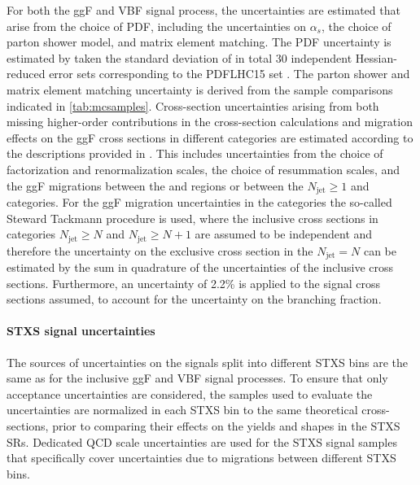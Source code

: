 For both the ggF and VBF signal process, the uncertainties are estimated that arise from the choice of PDF, including the uncertainties on $\alpha_s$, the choice of parton shower model, and matrix element matching.
The PDF uncertainty is estimated by taken the standard deviation of in total 30 independent Hessian-reduced error sets corresponding to the PDFLHC15 set \cite{Butterworth:2015oua}. 
The parton shower and matrix element matching uncertainty is derived from the sample comparisons indicated in \cref{tab:mcsamples}.
Cross-section uncertainties arising from both missing higher-order contributions in the cross-section calculations and migration effects on the ggF cross sections in different \Njets categories are estimated according to the descriptions provided in .
This includes uncertainties from the choice of factorization and renormalization scales, the choice of resummation scales, and the ggF migrations between the \ZeroJet and \OneJet regions or between the $N_{\text{jet}} \ge 1$  and \TwoJet categories.
For the ggF migration uncertainties in the \TwoJet categories the so-called Steward Tackmann procedure is used, where the inclusive cross sections in categories $N_{\text{jet}} \ge N$ and $N_{\text{jet}} \ge N+1$ are assumed to be independent and therefore the uncertainty on the exclusive cross section in the $N_{\text{jet}} = N$ can be estimated by the sum in quadrature of the uncertainties of the inclusive cross sections.
Furthermore, an uncertainty of 2.2\% is applied to the signal cross sections assumed, to account for the uncertainty on the \HWW branching fraction. 

\paragraph{STXS signal uncertainties}
The sources of uncertainties on the signals split into different STXS bins are the same as for the inclusive ggF and VBF signal processes. 
To ensure that only acceptance uncertainties are considered, the samples used to evaluate the uncertainties are normalized in each STXS bin to the same theoretical cross-sections, prior to comparing their effects on the yields and shapes in the STXS SRs. 
Dedicated QCD scale uncertainties are used for the STXS signal samples that specifically cover uncertainties due to migrations between different STXS bins. 

